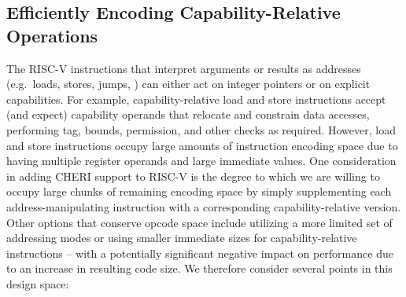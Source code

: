 \subsection{Efficiently Encoding Capability-Relative Operations}
\label{subsec-encoding-cap-ops}

The RISC-V instructions that interpret arguments or results as addresses
(e.g.\ loads, stores, jumps, ) can either act on integer pointers
or on explicit capabilities.
For example, capability-relative load and store instructions accept (and expect) capability
operands that relocate and constrain data accesses, performing tag, bounds,
permission, and other checks as required.
However, load and store instructions occupy large amounts of instruction
encoding space due to having multiple register operands and large immediate
values.
One consideration in adding CHERI support to RISC-V is the degree to which we
are willing to occupy large chunks of remaining encoding space by simply
supplementing each address-manipulating instruction with a
corresponding capability-relative version.
Other options that conserve opcode space include utilizing a more limited set
of addressing modes or using smaller immediate sizes for capability-relative
instructions -- with a potentially significant negative impact on performance
due to an increase in resulting code size.
We therefore consider several points in this design space:

